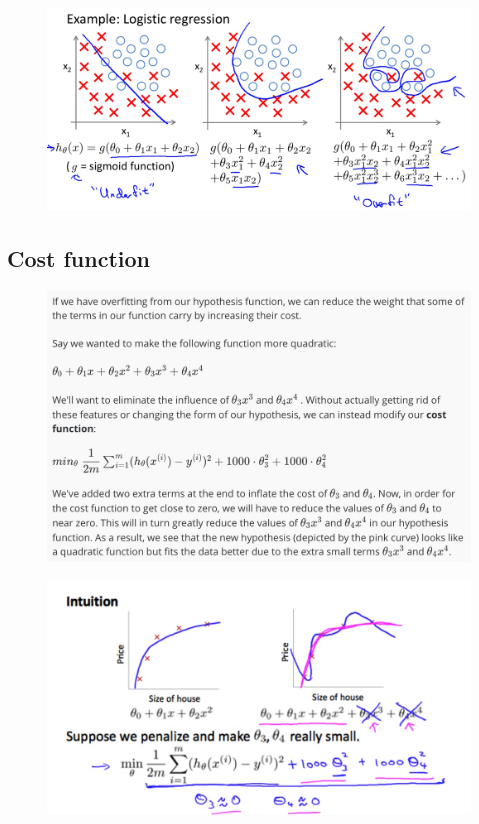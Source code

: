 \documentclass[12pt, A4,onecolumn]{article} %
\begin{document}
\begin{figure}[H]
	\centering
	\includegraphics[width=1\textwidth]{./Imagenes/overfit5}
\end{figure}

\subsection{Cost function}
\begin{figure}[H]
	\centering
	\includegraphics[width=1\textwidth]{./Imagenes/regulCostFunc1}
\end{figure}

\begin{figure}[H]
	\centering
	\includegraphics[width=1\textwidth]{./Imagenes/regulCostFunc2}
\end{figure}
\end{document}
